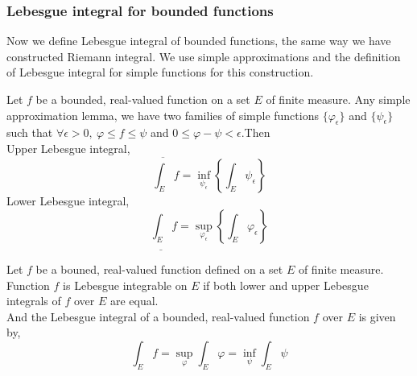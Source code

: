 \subsubsection{Lebesgue integral for bounded functions}
	Now we define Lebesgue integral of bounded functions, the same way we have constructed Riemann integral.
	We use simple approximations and the definition of Lebesgue integral for simple functions for this construction.
\begin{definition}
	Let $f$ be a bounded, real-valued function on a set $E$ of finite measure.
	Any simple approximation lemma, we have two families of simple functions $\{ \varphi_\epsilon\}$ and $\{ \psi_\epsilon \}$ such that $\forall \epsilon > 0,\ \varphi \le f \le \psi$ and $0 \le \varphi-\psi < \epsilon$.Then \\
	Upper Lebesgue integral,
	\begin{equation}
		\overline{\int_E} f = \inf_{\psi_\epsilon} \left\{ \int_E \psi_\epsilon \right\}
	\end{equation}
	Lower Lebesgue integral,
	\begin{equation}
		\underline{\int_E} f = \sup_{\varphi_\epsilon} \left\{ \int_E \varphi_\epsilon \right\}
	\end{equation}

\end{definition}

\begin{definition}
	Let $f$ be a bouned, real-valued function defined on a set $E$ of finite measure.
	Function $f$ is Lebesgue integrable on $E$ if both lower and upper Lebesgue integrals of $f$ over $E$ are equal.\\

	And the Lebesgue integral of a bounded, real-valued function $f$ over $E$ is given by,
	\begin{equation}
		\int_E f = \sup_\varphi \int_E \varphi = \inf_\psi \int_E \psi
	\end{equation}
\end{definition}

